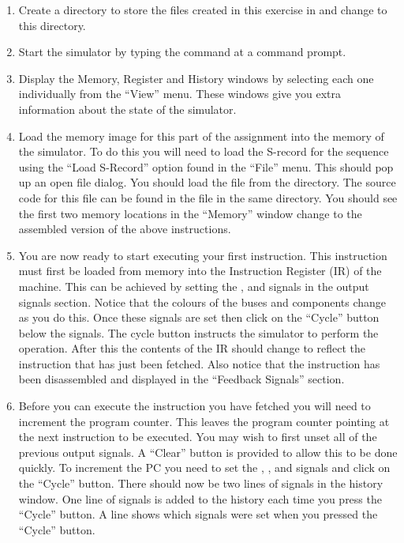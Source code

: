 \documentclass[a4paper,10pt]{article}
\begin{document}
\begin{enumerate}

\item Create a directory to store the files created in this exercise
in and change to this directory.

\item Start the simulator by typing the command  at
a command prompt.

\item Display the Memory, Register and History windows by selecting
each one individually from the ``View'' menu. These windows give you
extra information about the state of the simulator.

\item Load the memory image for this part of the assignment into the
memory of the simulator. To do this you will need to load the S-record
for the sequence using the ``Load S-Record'' option found in the
``File'' menu. This should pop up an open file dialog. You should load
the file  from the 
directory. The source code for this file can be found in the
 file in the same directory. You should see the first
two memory locations in the ``Memory'' window change to the assembled
version of the above instructions.

\item 
\label{ques:ifetch}
You are now ready to start executing your first instruction. This
instruction must first be loaded from memory into the Instruction
Register (IR) of the machine. This can be achieved by setting the
,  and  signals in
the output signals section. Notice that the colours of the buses and
components change as you do this. Once these signals are set then
click on the ``Cycle'' button below the signals. The cycle button
instructs the simulator to perform the operation. After this the
contents of the IR should change to reflect the instruction that has
just been fetched. Also notice that the instruction has been
disassembled and displayed in the ``Feedback Signals'' section.

\item Before you can execute the instruction you have fetched you will
need to increment the program counter. This leaves the program counter
pointing at the next instruction to be executed. You may wish to first
unset all of the previous output signals. A ``Clear'' button is
provided to allow this to be done quickly. To increment the PC you
need to set the , ,
 and  signals and click on the
``Cycle'' button. There should now be two lines of signals in the
history window. One line of signals is added to the history each time
you press the ``Cycle'' button. A line shows which signals
were set when you pressed the ``Cycle'' button.


\end{enumerate}
\end{document}
